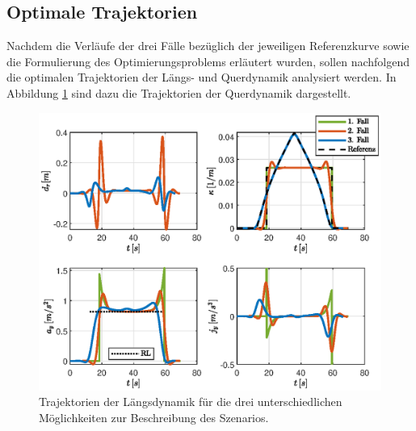 \subsection{Optimale Trajektorien}
Nachdem die Verläufe der drei Fälle bezüglich der jeweiligen Referenzkurve sowie die Formulierung des Optimierungsproblems erläutert wurden, sollen nachfolgend die optimalen Trajektorien der Längs- und Querdynamik analysiert werden. In Abbildung \ref{fig:gerade_kurve_gerade_lat_dyn} sind dazu die Trajektorien der Querdynamik dargestellt. 
\begin{figure}[h] 
	\centering
	\includegraphics[width=\linewidth]{./Bilder/Ergebnisse/Gerade_Kurve_Gerade/lat_dyn.eps}
	\caption{Trajektorien der Längsdynamik für die drei unterschiedlichen Möglichkeiten zur Beschreibung des Szenarios.}
	\label{fig:gerade_kurve_gerade_lat_dyn}
\end{figure}  
